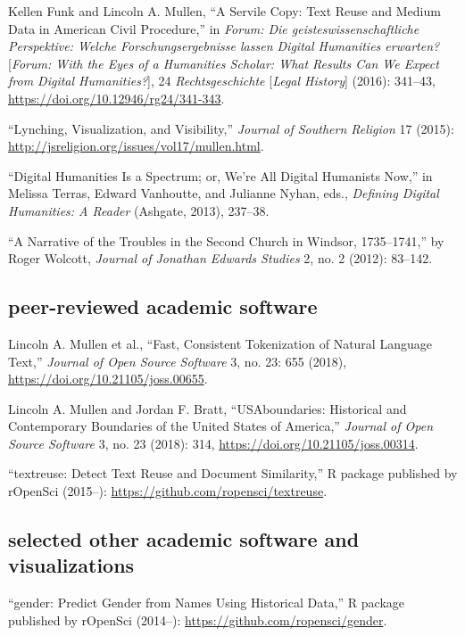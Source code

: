 \documentclass[11pt]{article}
\begin{document}
Kellen Funk and Lincoln A. Mullen, ``A Servile Copy: Text Reuse and Medium Data 
in American Civil Procedure,'' in \emph{Forum: Die geisteswissenschaftliche 
  Perspektive: Welche Forschungsergebnisse lassen Digital Humanities 
  erwarten?} [\emph{Forum: With the Eyes of a Humanities Scholar: What Results 
  Can We Expect from Digital Humanities?}], 24 \emph{Rechtsgeschichte} 
[\emph{Legal History}] (2016): 341--43, 
\url{https://doi.org/10.12946/rg24/341-343}.

``Lynching, Visualization, and Visibility,'' \emph{Journal of Southern 
  Religion} 17 (2015): \url{http://jsreligion.org/issues/vol17/mullen.html}.

``Digital Humanities Is a Spectrum; or, We're All Digital Humanists
Now,'' in Melissa Terras, Edward Vanhoutte, and Julianne Nyhan, eds.,
\emph{Defining Digital Humanities: A Reader} (Ashgate, 2013), 237--38.

``A Narrative of the Troubles in the Second Church in Windsor,
1735--1741,'' by Roger Wolcott, \emph{Journal of Jonathan Edwards
  Studies} 2, no. 2 (2012): 83--142.

\subsection{peer-reviewed academic software}\label{academic-software}

Lincoln A. Mullen et al., ``Fast, Consistent Tokenization of Natural Language 
Text,'' \emph{Journal of Open Source Software} 3, no. 23: 655 (2018), 
\url{https://doi.org/10.21105/joss.00655}.

Lincoln A. Mullen and Jordan F. Bratt, ``USAboundaries: Historical and 
Contemporary Boundaries of the United States of America,'' \emph{Journal of 
Open Source Software} 3, no. 23 (2018): 314, 
\url{https://doi.org/10.21105/joss.00314}.

``textreuse: Detect Text Reuse and Document Similarity,'' R package published 
by rOpenSci (2015--): 
\url{https://github.com/ropensci/textreuse}.

\subsection{selected other academic software and visualizations}\label{other-academic-software}

``gender: Predict Gender from Names Using Historical Data,'' R package 
published by rOpenSci (2014--): \url{https://github.com/ropensci/gender}.
\end{document}
